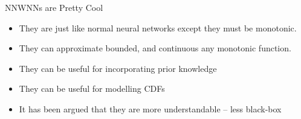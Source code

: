 \documentclass[dvipsnames]{beamer}
\begin{document}
\begin{frame}{NNWNNs are Pretty Cool}
	\begin{itemize}
		\item They are just like normal neural networks except they must be monotonic.
		\item They can approximate bounded, and continuous any monotonic function.
		\item They can be useful for incorporating prior knowledge
		\item They can be useful for modelling CDFs
		\item It has been argued that they are more understandable -- less black-box

	\end{itemize}
\end{frame}
\end{document}
